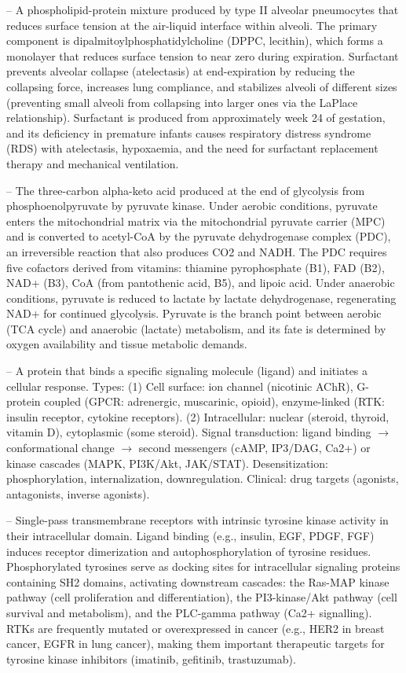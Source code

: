 -- A phospholipid-protein mixture produced by type II alveolar pneumocytes that reduces surface tension at the air-liquid interface within alveoli. The primary component is dipalmitoylphosphatidylcholine (DPPC, lecithin), which forms a monolayer that reduces surface tension to near zero during expiration. Surfactant prevents alveolar collapse (atelectasis) at end-expiration by reducing the collapsing force, increases lung compliance, and stabilizes alveoli of different sizes (preventing small alveoli from collapsing into larger ones via the LaPlace relationship). Surfactant is produced from approximately week 24 of gestation, and its deficiency in premature infants causes respiratory distress syndrome (RDS) with atelectasis, hypoxaemia, and the need for surfactant replacement therapy and mechanical ventilation.

-- The three-carbon alpha-keto acid produced at the end of glycolysis from phosphoenolpyruvate by pyruvate kinase. Under aerobic conditions, pyruvate enters the mitochondrial matrix via the mitochondrial pyruvate carrier (MPC) and is converted to acetyl-CoA by the pyruvate dehydrogenase complex (PDC), an irreversible reaction that also produces CO2 and NADH. The PDC requires five cofactors derived from vitamins: thiamine pyrophosphate (B1), FAD (B2), NAD+ (B3), CoA (from pantothenic acid, B5), and lipoic acid. Under anaerobic conditions, pyruvate is reduced to lactate by lactate dehydrogenase, regenerating NAD+ for continued glycolysis. Pyruvate is the branch point between aerobic (TCA cycle) and anaerobic (lactate) metabolism, and its fate is determined by oxygen availability and tissue metabolic demands.

-- A protein that binds a specific signaling molecule (ligand) and initiates a cellular response. Types: (1) Cell surface: ion channel (nicotinic AChR), G-protein coupled (GPCR: adrenergic, muscarinic, opioid), enzyme-linked (RTK: insulin receptor, cytokine receptors). (2) Intracellular: nuclear (steroid, thyroid, vitamin D), cytoplasmic (some steroid). Signal transduction: ligand binding $\rightarrow$ conformational change $\rightarrow$ second messengers (cAMP, IP3/DAG, Ca2+) or kinase cascades (MAPK, PI3K/Akt, JAK/STAT). Desensitization: phosphorylation, internalization, downregulation. Clinical: drug targets (agonists, antagonists, inverse agonists).

-- Single-pass transmembrane receptors with intrinsic tyrosine kinase activity in their intracellular domain. Ligand binding (e.g., insulin, EGF, PDGF, FGF) induces receptor dimerization and autophosphorylation of tyrosine residues. Phosphorylated tyrosines serve as docking sites for intracellular signaling proteins containing SH2 domains, activating downstream cascades: the Ras-MAP kinase pathway (cell proliferation and differentiation), the PI3-kinase/Akt pathway (cell survival and metabolism), and the PLC-gamma pathway (Ca2+ signalling). RTKs are frequently mutated or overexpressed in cancer (e.g., HER2 in breast cancer, EGFR in lung cancer), making them important therapeutic targets for tyrosine kinase inhibitors (imatinib, gefitinib, trastuzumab).

